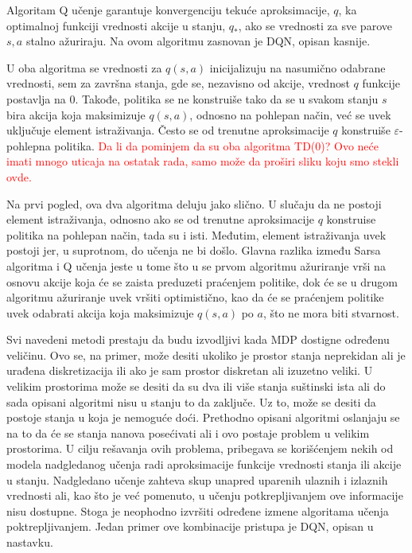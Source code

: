 Algoritam Q učenje garantuje konvergenciju tekuće aproksimacije, $q$, ka optimalnoj funkciji vrednosti akcije u stanju, $q_*$, ako se vrednosti za sve parove $s, a$ stalno ažuriraju. Na ovom algoritmu zasnovan je DQN, opisan kasnije.
\par 
U oba algoritma se vrednosti za $q(s,a)$ inicijalizuju na nasumično odabrane vrednosti, sem za završna stanja, gde se, nezavisno od akcije, vrednost $q$ funkcije postavlja na $0$. Takođe, politika se ne konstruiše tako da se u svakom stanju $s$ bira akcija koja maksimizuje $q(s,a)$, odnosno na pohlepan način, već se uvek uključuje element istraživanja. Često se od trenutne aproksimacije $q$ konstruiše $\varepsilon$-pohlepna politika. \textcolor{red}{Da li da pominjem da su oba algoritma TD(0)? Ovo neće imati mnogo uticaja na ostatak rada, samo može da proširi sliku koju smo stekli ovde.}
\par 
Na prvi pogled, ova dva algoritma deluju jako slično. U slučaju da ne postoji element istraživanja, odnosno ako se od trenutne aproksimacije $q$ konstruise politika na pohlepan način, tada su i isti. Međutim, element istraživanja uvek postoji jer, u suprotnom, do učenja ne bi došlo. Glavna razlika između Sarsa algoritma i Q učenja jeste u tome što u se prvom algoritmu ažuriranje vrši na osnovu akcije koja će se zaista preduzeti praćenjem politike, dok će se u drugom algoritmu ažuriranje uvek vršiti optimistično, kao da će se praćenjem politike uvek odabrati akcija koja maksimizuje $q(s,a)$ po $a$, što ne mora biti stvarnost. 
\par 
Svi navedeni metodi prestaju da budu izvodljivi kada MDP dostigne određenu veličinu. Ovo se, na primer, može desiti ukoliko je prostor stanja neprekidan ali je urađena diskretizacija ili ako je sam prostor diskretan ali izuzetno veliki. U velikim prostorima može se desiti da su dva ili više stanja suštinski ista ali do sada opisani algoritmi nisu u stanju to da zaključe. Uz to, može se desiti da postoje stanja u koja je nemoguće doći. Prethodno opisani algoritmi oslanjaju se na to da će se stanja nanova posećivati ali i ovo postaje problem u velikim prostorima. U cilju rešavanja ovih problema, pribegava se korišćenjem nekih od modela nadgledanog učenja radi aproksimacije funkcije vrednosti stanja ili akcije u stanju. Nadgledano učenje zahteva skup unapred uparenih ulaznih i izlaznih vrednosti ali, kao što je već pomenuto, u učenju potkrepljivanjem ove informacije nisu dostupne. Stoga je neophodno izvršiti određene izmene algoritama učenja poktrepljivanjem. Jedan primer ove kombinacije pristupa je DQN, opisan u nastavku.

